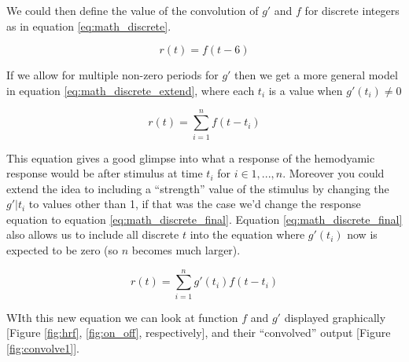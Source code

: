 \documentclass[11pt]{article}
\begin{document}
We could then define the value of the convolution of $g'$ and $f$ for discrete 
integers as in equation \ref{eq:math_discrete}.


\begin{equation}  \label{eq:math_discrete}
r(t)=  f(t-6)
\end{equation}



If we allow for multiple non-zero periods for $g'$ then we get a more general 
model in equation \ref{eq:math_discrete_extend}, where each $t_i$ is a value 
when $g'(t_i) \neq 0$

\begin{equation}  \label{eq:math_discrete_extend}
r(t)= \sum_{i=1}^n f(t-t_i)
\end{equation}

This equation gives a good glimpse into what a response of the hemodyamic 
response would be after stimulus at time $t_i$ for $i \in {1,...,n}$. Moreover 
you could extend the idea to including a ``strength'' value of the stimulus by 
changing the $g'|t_i$ to values other than 1, if that was the case we'd change 
the response equation to equation \ref{eq:math_discrete_final}. Equation 
\ref{eq:math_discrete_final} also allows us to include all discrete $t$ into 
the equation where $g'(t_i)$ now is expected to be zero (so $n$ becomes much 
larger). 

\begin{equation}  \label{eq:math_discrete_final}
r(t)= \sum_{i=1}^n g'(t_i) f(t-t_i)
\end{equation}


WIth this new equation we can look at function $f$ and $g'$ displayed 
graphically [Figure \ref{fig:hrf}, \ref{fig:on_off}, respectively], and 
their ``convolved'' output [Figure \ref{fig:convolve1}].
\end{document}
